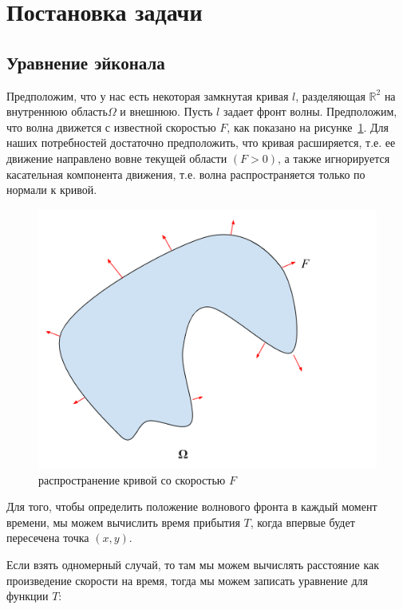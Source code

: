 \section{Постановка задачи}
\label{sec:theory}

\subsection {Уравнение эйконала}
\label{sec:csdisttrack}


Предположим, что у нас есть некоторая замкнутая кривая $l$,
разделяющая $\mathbb{R}^2$ на внутреннюю область$\Omega$ и
внешнюю. Пусть $l$ задает фронт волны. Предположим, что волна движется
с известной скоростью $F$, как показано на
рисунке~\ref{fig:eikvis}. Для наших потребностей достаточно
предположить, что кривая расширяется, т.е. ее движение направлено
вовне текущей области $(F>0)$, а также игнорируется касательная
компонента движения, т.е. волна распространяется только по
нормали к кривой.

\begin{figure}[h]
  \centering
  \includegraphics[width=0.5\linewidth]{img/eikonal_vision.png}
  \hfil \caption{распространение кривой со скоростью $F$}
  \label{fig:eikvis}

\end{figure}


Для того, чтобы определить положение волнового фронта в каждый момент
времени, мы можем вычислить время прибытия $T$, когда впервые будет
пересечена точка $(x,y)$.

Если взять одномерный случай, то там мы можем вычислять расстояние как
произведение скорости на время, тогда мы можем записать уравнение для
функции $T$:

